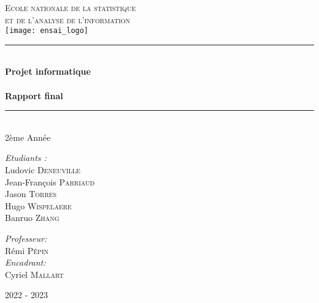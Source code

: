 \documentclass[11pt]{article}
\newcommand{\HRule}{\rule{\linewidth}{0.5mm}}
\begin{document}

\begin{titlepage}
\begin{center}


\textsc{{\LARGE Ecole nationale de la statistique \\et de l'analyse de l'information}} \\ %
\vspace{5mm}
\texttt{[image: ensai\_logo]}\\[2 cm] %



\HRule \\[0.4cm]
{ \huge \bfseries Projet informatique \\ \ \\ Rapport final}\\[0.4cm]

\HRule \\[1cm]

{\Large 2ème Année}\\ [2cm]


\begin{flushleft} \Large
\emph{Etudiants :}\\
Ludovic \textsc{Deneuville} \\
Jean-François \textsc{Parriaud} \\
Jason \textsc{Torres} \\
Hugo \textsc{Wispelaere} \\
Banruo \textsc{Zhang} \\
\end{flushleft}

\begin{flushright} \Large
\emph{Professeur:} \\
Rémi \textsc{Pépin} \\
\emph{Encadrant:} \\
Cyriel \textsc{Mallart} \\
\end{flushright}


\vfill
{\large 2022 - 2023}
\end{center}
\end{titlepage} 
\end{document}
